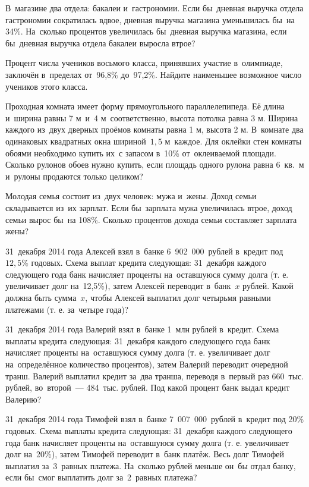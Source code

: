  В~магазине два отдела: бакалеи и~гастрономии. Если бы~дневная выручка отдела гастрономии сократилась вдвое, дневная выручка магазина уменьшилась бы~на 34\%. На~сколько процентов увеличилась бы~дневная выручка магазина, если бы~дневная выручка отдела бакалеи выросла втрое?

 Процент числа учеников восьмого класса, принявших участие в~олимпиаде, заключён в~пределах от~96,8\% до~97,2\%. Найдите наименьшее возможное число учеников этого класса.

 Проходная комната имеет форму прямоугольного параллелепипеда. Её длина и~ширина равны 7 м~и~4 м~соответственно, высота потолка равна 3 м. 
Ширина каждого из~двух дверных проёмов комнаты равна 1 м, высота 2 м. В~комнате два одинаковых квадратных окна шириной~$1{,}5$ м~каждое. 
Для оклейки стен комнаты обоями необходимо купить их~с запасом в~10\% от~оклеиваемой площади.
Сколько рулонов обоев нужно купить, если площадь одного рулона равна 6~кв.~м и~рулоны продаются только целиком?

 Молодая семья состоит из~двух человек: мужа и~жены. Доход семьи складывается из~их зарплат. Если бы~зарплата мужа увеличилась втрое, доход семьи вырос бы~на 108\%. Сколько процентов дохода семьи составляет зарплата жены?

 31~декабря 2014 года Алексей взял в~банке 6~902~000~рублей в~кредит под $12{,}5\%$ годовых. Схема выплат кредита следующая: 
31~декабря каждого следующего года банк начисляет проценты на~оставшуюся сумму долга (т. е. увеличивает долг на~12,5\%), 
затем Алексей переводит в~банк~$x$ рублей. Какой должна быть сумма~$x$, 
чтобы Алексей выплатил долг четырьмя равными платежами (т. е. за~четыре года)?

 31~декабря 2014 года Валерий взял в~банке 1~млн рублей в~кредит. Схема выплаты кредита следующая: 
31~декабря каждого следующего года банк начисляет проценты на~оставшуюся сумму долга (т. е. увеличивает долг на~определённое количество процентов), 
затем Валерий переводит очередной транш. Валерий выплатил кредит за~два транша, 
переводя в~первый раз 660~тыс. рублей, во~второй~--- 484~тыс. рублей. 
Под какой процент банк выдал кредит Валерию?

 31~декабря 2014 года Тимофей взял в~банке 7~007~000~рублей в~кредит под 20\% годовых. Схема выплаты кредита следующая: 31~декабря каждого следующего года банк начисляет проценты на~оставшуюся сумму долга (т. е. увеличивает долг на~20\%), затем Тимофей переводит в~банк платёж. Весь долг Тимофей выплатил за~3~равных платежа. На~сколько рублей меньше он~бы отдал банку, если бы~смог выплатить долг за~2~равных платежа?

